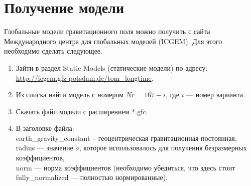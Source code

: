 \documentclass[11pt, a4paper,addpoints]{exam}
\theoremstyle{remark}
\begin{document}
   \section*{\centering Получение модели}
    Глобальные модели гравитационного поля можно получить с сайта Международного центра для глобальных
    моделей (ICGEM). Для этого необходимо сделать следующее.
    \begin{enumerate}
        \item Зайти в раздел Static Models (статические модели) по адресу:\\
            \url{http://icgem.gfz-potsdam.de/tom_longtime}.
        \item Из списка найти модель с номером $Nr = 167 - i$, где $i$ --- номер варианта.
        \item Скачать файл модели с расширением *.gfc.
        \item В заголовке файла: \\
            earth\_gravity\_constant -- геоцентрическая гравитационная постоянная, \\
            radius --- значение $a$, которое использовалось для получения безразмерных
            коэффициентов, \\
            norm --- норма коэффициентов (необходимо убедиться, что здесь стоит fully\_normalized
            --- полностью нормированные).
    \end{enumerate}

\end{document}
